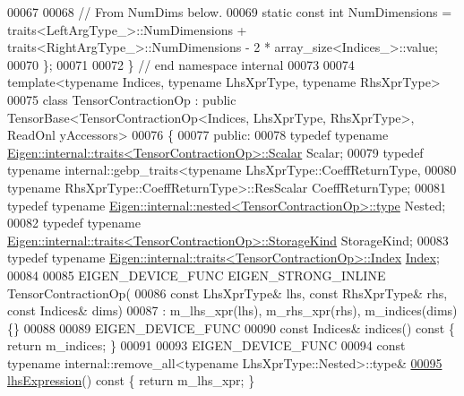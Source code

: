 \begin{DoxyCode}
00067 
00068   \textcolor{comment}{// From NumDims below.}
00069   \textcolor{keyword}{static} \textcolor{keyword}{const} \textcolor{keywordtype}{int} NumDimensions = traits<LeftArgType\_>::NumDimensions + 
      traits<RightArgType\_>::NumDimensions - 2 * array\_size<Indices\_>::value;
00070 \};
00071 
00072 \}  \textcolor{comment}{// end namespace internal}
00073 
00074 \textcolor{keyword}{template}<\textcolor{keyword}{typename} Indices, \textcolor{keyword}{typename} LhsXprType, \textcolor{keyword}{typename} RhsXprType>
00075 \textcolor{keyword}{class }TensorContractionOp : \textcolor{keyword}{public} TensorBase<TensorContractionOp<Indices, LhsXprType, RhsXprType>, ReadOnl
      yAccessors>
00076 \{
00077   \textcolor{keyword}{public}:
00078   \textcolor{keyword}{typedef} \textcolor{keyword}{typename} \hyperlink{struct_eigen_1_1internal_1_1traits}{Eigen::internal::traits<TensorContractionOp>::Scalar}
       Scalar;
00079   \textcolor{keyword}{typedef} \textcolor{keyword}{typename} internal::gebp\_traits<\textcolor{keyword}{typename} LhsXprType::CoeffReturnType,
00080                                                    \textcolor{keyword}{typename} RhsXprType::CoeffReturnType>::ResScalar 
      CoeffReturnType;
00081   \textcolor{keyword}{typedef} \textcolor{keyword}{typename} \hyperlink{class_eigen_1_1internal_1_1_tensor_lazy_evaluator_writable}{Eigen::internal::nested<TensorContractionOp>::type}
       Nested;
00082   \textcolor{keyword}{typedef} \textcolor{keyword}{typename} \hyperlink{struct_eigen_1_1internal_1_1traits}{Eigen::internal::traits<TensorContractionOp>::StorageKind}
       StorageKind;
00083   \textcolor{keyword}{typedef} \textcolor{keyword}{typename} \hyperlink{struct_eigen_1_1internal_1_1traits}{Eigen::internal::traits<TensorContractionOp>::Index}
       \hyperlink{namespace_eigen_a62e77e0933482dafde8fe197d9a2cfde}{Index};
00084 
00085   EIGEN\_DEVICE\_FUNC EIGEN\_STRONG\_INLINE TensorContractionOp(
00086       \textcolor{keyword}{const} LhsXprType& lhs, \textcolor{keyword}{const} RhsXprType& rhs, \textcolor{keyword}{const} Indices& dims)
00087       : m\_lhs\_xpr(lhs), m\_rhs\_xpr(rhs), m\_indices(dims) \{\}
00088 
00089   EIGEN\_DEVICE\_FUNC
00090   \textcolor{keyword}{const} Indices& indices()\textcolor{keyword}{ const }\{ \textcolor{keywordflow}{return} m\_indices; \}
00091 
00093   EIGEN\_DEVICE\_FUNC
00094   \textcolor{keyword}{const} \textcolor{keyword}{typename} internal::remove\_all<typename LhsXprType::Nested>::type&
\hyperlink{class_eigen_1_1_tensor_contraction_op_a1e3bb92babac5554f7164b12e9654daa}{00095}   \hyperlink{class_eigen_1_1_tensor_contraction_op_a1e3bb92babac5554f7164b12e9654daa}{lhsExpression}()\textcolor{keyword}{ const }\{ \textcolor{keywordflow}{return} m\_lhs\_xpr; \}

\end{DoxyCode}
